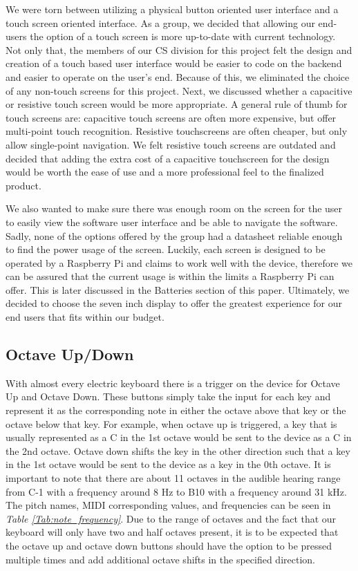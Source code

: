 We were torn between utilizing a physical button oriented user interface and a touch screen oriented interface. As a group, we decided that allowing our end-users the option of a touch screen is more up-to-date with current technology. Not only that, the members of our CS division for this project felt the design and creation of a touch based user interface would be easier to code on the backend and easier to operate on the user’s end. Because of this, we eliminated the choice of any non-touch screens for this project. Next, we discussed whether a capacitive or resistive touch screen would be more appropriate. A general rule of thumb for touch screens are: capacitive touch screens are often more expensive, but offer multi-point touch recognition. Resistive touchscreens are often cheaper, but only allow single-point navigation. We felt resistive touch screens are outdated and decided that adding the extra cost of a capacitive touchscreen for the design would be worth the ease of use and a more professional feel to the finalized product.

We also wanted to make sure there was enough room on the screen for the user to easily view the software user interface and be able to navigate the software. Sadly, none of the options offered by the group had a datasheet reliable enough to find the power usage of the screen. Luckily, each screen is designed to be operated by a Raspberry Pi and claims to work well with the device, therefore we can be assured that the current usage is within the limits a Raspberry Pi can offer. This is later discussed in the Batteries section of this paper. Ultimately, we decided to choose the seven inch display to offer the greatest experience for our end users that fits within our budget.

\subsection{Octave Up/Down}

With almost every electric keyboard there is a trigger on the device for Octave Up and Octave Down. These buttons simply take the input for each key and represent it as the corresponding note in either the octave above that key or the octave below that key. For example, when octave up is triggered, a key that is usually represented as a C in the 1st octave would be sent to the device as a C in the 2nd octave. Octave down shifts the key in the other direction such that a key in the 1st octave would be sent to the device as a key in the 0th octave. It is important to note that there are about 11 octaves in the audible hearing range from C-1 with a frequency around 8 Hz to B10 with a frequency around 31 kHz. The pitch names, MIDI corresponding values, and frequencies can be seen in \textit{Table \ref{Tab:note_frequency}}. Due to the range of octaves and the fact that our keyboard will only have two and half octaves present, it is to be expected that the octave up and octave down buttons should have the option to be pressed multiple times and add additional octave shifts in the specified direction.

